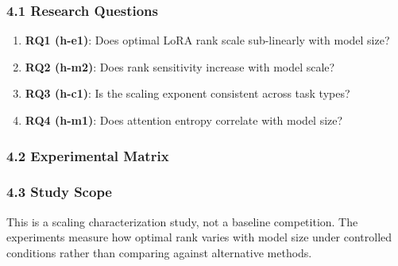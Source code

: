 
\subsubsection{4.1 Research Questions}

\begin{enumerate}
\item \textbf{RQ1 (h-e1)}: Does optimal LoRA rank scale sub-linearly with model size?
\item \textbf{RQ2 (h-m2)}: Does rank sensitivity increase with model scale?
\item \textbf{RQ3 (h-c1)}: Is the scaling exponent consistent across task types?
\item \textbf{RQ4 (h-m1)}: Does attention entropy correlate with model size?
\end{enumerate}

\subsubsection{4.2 Experimental Matrix}

\begin{table}[htbp]
\centering
{}
\end{table}

\subsubsection{4.3 Study Scope}

This is a scaling characterization study, not a baseline competition. The experiments measure how optimal rank varies with model size under controlled conditions rather than comparing against alternative methods.
